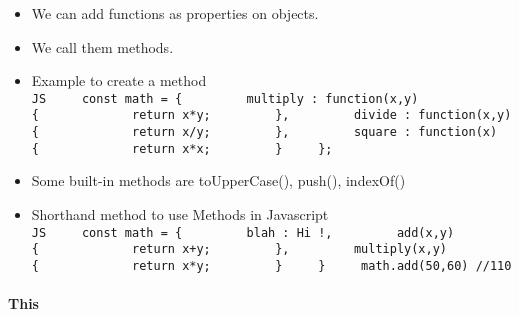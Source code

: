 \documentclass[
  paper=a4,
  ,captions=tableheading
]{scrartcl}
\providecommand{\tightlist}{%
  \setlength{\itemsep}{0pt}\setlength{\parskip}{0pt}}
\begin{document}
\begin{itemize}
\tightlist
\item
  We can add functions as properties on objects.
\item
  We call them methods.
\item
  Example to create a method
  \texttt{JS\ \ \ \ \ const\ math\ =\ \{\ \ \ \ \ \ \ \ \ multiply\ :\ function(x,y)\{\ \ \ \ \ \ \ \ \ \ \ \ \ return\ x*y;\ \ \ \ \ \ \ \ \ \},\ \ \ \ \ \ \ \ \ divide\ :\ function(x,y)\{\ \ \ \ \ \ \ \ \ \ \ \ \ return\ x/y;\ \ \ \ \ \ \ \ \ \},\ \ \ \ \ \ \ \ \ square\ :\ function(x)\{\ \ \ \ \ \ \ \ \ \ \ \ \ return\ x*x;\ \ \ \ \ \ \ \ \ \}\ \ \ \ \ \};}
\item
  Some built-in methods are toUpperCase(), push(), indexOf()
\item
  Shorthand method to use Methods in Javascript
  \texttt{JS\ \ \ \ \ const\ math\ =\ \{\ \ \ \ \ \ \ \ \ blah\ :\ \textquotesingle{}Hi\ !\textquotesingle{},\ \ \ \ \ \ \ \ \ add(x,y)\{\ \ \ \ \ \ \ \ \ \ \ \ \ return\ x+y;\ \ \ \ \ \ \ \ \ \},\ \ \ \ \ \ \ \ \ multiply(x,y)\{\ \ \ \ \ \ \ \ \ \ \ \ \ return\ x*y;\ \ \ \ \ \ \ \ \ \}\ \ \ \ \ \}\ \ \ \ \ math.add(50,60)\ //110}
\end{itemize}

\hypertarget{this}{%
\paragraph{This}\label{this}}
\end{document}

